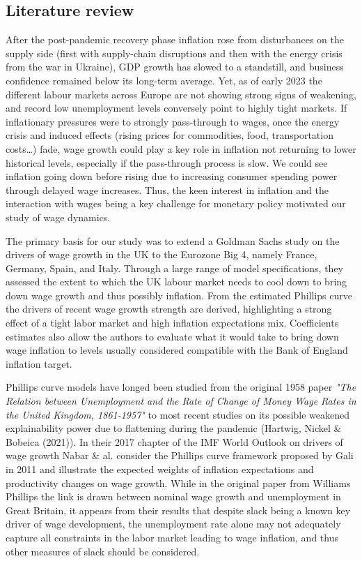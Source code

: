 \subsection{Literature review}

\quad After the post-pandemic recovery phase inflation rose from disturbances on the supply side (first with supply-chain disruptions and then with the energy crisis from the war in Ukraine), GDP growth has slowed to a standstill, and business confidence remained below its long-term average. 
Yet, as of early 2023 the different labour markets across Europe are not showing strong signs of weakening, and record low unemployment levels conversely point to highly tight markets. 
If inflationary pressures were to strongly pass-through to wages, once the energy crisis and induced effects (rising prices for commodities, food, transportation costs\dots) fade, wage growth could play a key role in inflation not returning to lower historical levels, especially if the pass-through process is slow. 
We could see inflation going down before rising due to increasing consumer spending power through delayed wage increases. 
Thus, the keen interest in inflation and the interaction with wages being a key challenge for monetary policy motivated our study of wage dynamics. 

The primary basis for our study was to extend a Goldman Sachs study on the drivers of wage growth in the UK to the Eurozone Big 4, namely France, Germany, Spain, and Italy. 
Through a large range of model specifications, they assessed the extent to which the UK labour market needs to cool down to bring down wage growth and thus possibly inflation.
From the estimated Phillips curve the drivers of recent wage growth strength are derived, highlighting a strong effect of a tight labor market and high inflation expectations mix.
Coefficients estimates also allow the authors to evaluate what it would take to bring down wage inflation to levels usually considered compatible with the Bank of England inflation target.

Phillips curve models have longed been studied from the original 1958 paper \textit{"The Relation between Unemployment and the Rate of Change of Money Wage Rates in the United Kingdom, 1861-1957"}\cite{labour0} to most recent studies on its possible weakened explainability power due to flattening during the pandemic (Hartwig, Nickel \& Bobeica (2021)\cite{labour1}). 
In their 2017 chapter of the IMF World Outlook on drivers of wage growth Nabar \& al.\cite{labour2} consider the Phillips curve framework proposed by Gali in 2011\cite{labour3} and illustrate the expected weights of inflation expectations and productivity changes on wage growth. 
While in the original paper from Williams Phillips the link is drawn between nominal wage growth and unemployment in Great Britain, it appears from their results that despite slack being a known key driver of wage development, the unemployment rate alone may not adequately capture all constraints in the labor market leading to wage inflation, and thus other measures of slack should be considered.

